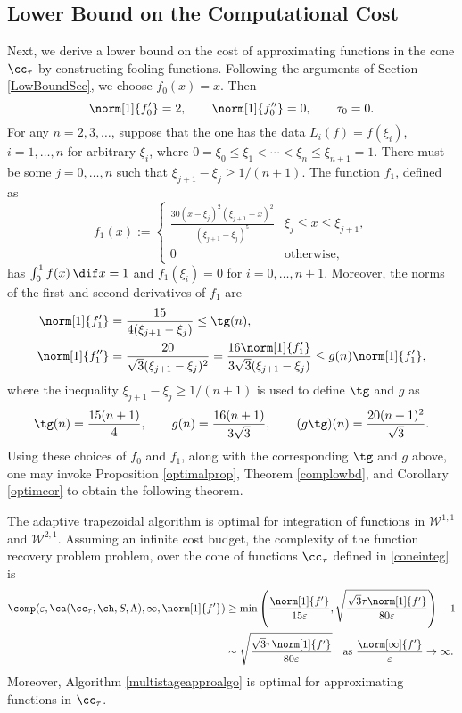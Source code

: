 \subsection{Lower Bound on the Computational Cost}
Next, we derive a lower bound on the cost of approximating functions in the cone $\cc_{\tau}$ by constructing fooling functions. Following the arguments of Section \ref{LowBoundSec}, we choose  $f_0(x)=x.$ Then
\[
\norm[1]{f'_0}=2, \qquad \norm[1]{f''_0}=0, \qquad \tau_0=0.
\]
For any $n =2, 3, \ldots$, suppose that the one has the data $L_i(f)=f(\xi_i)$, $i=1, \ldots, n$ for arbitrary $\xi_i$, where $0=\xi_0 \le \xi_1 < \cdots < \xi_n \le \xi_{n+1} = 1$.  There must be some $j=0, \ldots, n$ such that $\xi_{j+1} - \xi_j \ge 1/(n+1)$.  The function $f_{1}$, defined as
$$
f_{1}(x):=\begin{cases} \displaystyle
\frac{30(x-\xi_{j})^{2}(\xi_{j+1}-x)^{2}}{(\xi_{j+1}-\xi_{j})^5} & \xi_{j} \le x \leq \xi_{j+1},\\
0 & \text{otherwise},
\end{cases}
$$
has $\int_0^1 f(x) \, \dif x=1$ and $f_1(\xi_i)=0$ for $i=0, \ldots, n+1$.  Moreover, the norms of the first and second derivatives of $f_1$ are
\begin{align*}
\norm[1]{f'_1}&=\frac{15}{4(\xi_{j+1}-\xi_{j})}\leq \tg(n),\\
\norm[1]{f''_1}&=\frac{20}{\sqrt{3}(\xi_{j+1}-\xi_{j})^2}
=\frac{16\norm[1]{f'_1}}{3\sqrt{3}(\xi_{j+1}-\xi_{j})}
 \leq g(n) \norm[1]{f'_1},
\end{align*}
where the inequality $\xi_{j+1} - \xi_j \ge 1/(n+1)$ is used to define $\tg$ and $g$ as
\[
\tg(n) = \frac{15(n+1)}{4}, \qquad g(n) = \frac{16(n+1)}{3\sqrt{3}}, \qquad (g\tg)(n) = \frac{20(n+1)^2}{\sqrt{3}}.
\]
Using these choices of $f_0$ and $f_1$, along with the corresponding $\tg$ and $g$ above, one may invoke Proposition \ref{optimalprop}, Theorem \ref{complowbd}, and Corollary \ref{optimcor} to obtain the following theorem.

\begin{theorem} \label{complowbdinteg} The adaptive trapezoidal algorithm is optimal for integration of functions in $\mathcal{W}^{1,1}$ and $\mathcal{W}^{2,1}$. Assuming an infinite cost budget, the complexity of the function recovery problem problem, over the cone of functions $\cc_{\tau}$ defined in \eqref{coneinteg} is
\begin{align*}
\comp(\varepsilon,\ca(\cc_{\tau},\ch,S,\Lambda),\infty,\norm[1]{f'})
&\ge \min\left(\frac{\norm[1]{f'}}{15 \varepsilon}, \sqrt{\frac{\sqrt{3}\tau\norm[1]{f'}}{80\varepsilon}} \right)-1\\
& \sim \sqrt{\frac{\sqrt{3}\tau\norm[1]{f'}}{80\varepsilon}}  \quad\text{as } \frac{\norm[\infty]{f'}}{\varepsilon} \to \infty.
\end{align*}
Moreover, Algorithm \ref{multistageapproalgo} is optimal for approximating functions in $\cc_{\tau}$.
\end{theorem}


